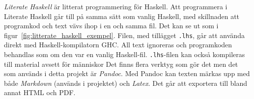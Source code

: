 \begin{draft}
\textit{Literate Haskell} är litterat programmering för Haskell.\cite{litterate_haskell}
Att programmera i Literate Haskell går till på samma sätt som vanlig Haskell,
med skillnaden att programkod och text vävs ihop i en och samma fil. Det kan
se ut som i figur~\ref{fig:litterate_haskell_exempel}. Filen, med tillägget
\texttt{.lhs}, går att använda direkt med Haskell-kompilatorn GHC. All text
ignoreras och programkoden behandlas som om den var en vanlig
Haskell-fil. \texttt{.lhs}-filen kan också kompileras till material avsett för
människor Det finns flera verktyg som gör det men det som används i detta
projekt är \textit{Pandoc}\cite{pandoc}. Med Pandoc kan texten märkas
upp med både \textit{Markdown} (används i projektet) och \textit{Latex}. Det går
att exportera till bland annat HTML och PDF.
\end{draft}

